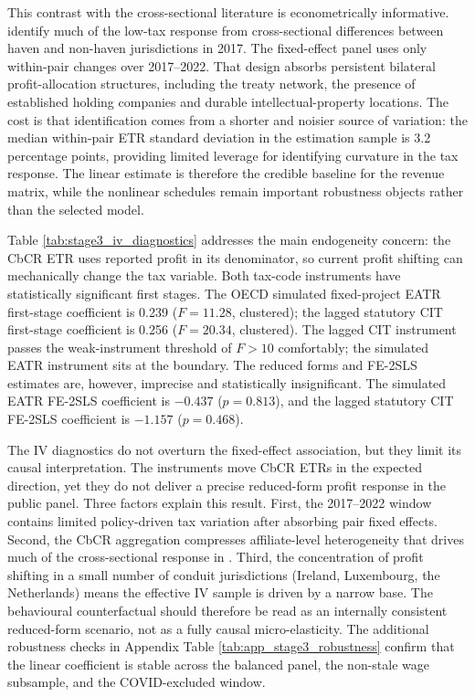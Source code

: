\documentclass[11pt,a4paper]{article}
\begin{document}
This contrast with the cross-sectional literature is econometrically informative. \citet{garcia-bernardo2024} identify much of the low-tax response from cross-sectional differences between haven and non-haven jurisdictions in 2017. The fixed-effect panel uses only within-pair changes over 2017--2022. That design absorbs persistent bilateral profit-allocation structures, including the treaty network, the presence of established holding companies and durable intellectual-property locations. The cost is that identification comes from a shorter and noisier source of variation: the median within-pair ETR standard deviation in the estimation sample is 3.2 percentage points, providing limited leverage for identifying curvature in the tax response. The linear estimate is therefore the credible baseline for the revenue matrix, while the nonlinear schedules remain important robustness objects rather than the selected model.




Table \ref{tab:stage3_iv_diagnostics} addresses the main endogeneity concern: the CbCR ETR uses reported profit in its denominator, so current profit shifting can mechanically change the tax variable. Both tax-code instruments have statistically significant first stages. The OECD simulated fixed-project EATR first-stage coefficient is 0.239 ($F = 11.28$, clustered); the lagged statutory CIT first-stage coefficient is 0.256 ($F = 20.34$, clustered). The lagged CIT instrument passes the \citet{stock2005} weak-instrument threshold of $F > 10$ comfortably; the simulated EATR instrument sits at the boundary. The reduced forms and FE-2SLS estimates are, however, imprecise and statistically insignificant. The simulated EATR FE-2SLS coefficient is $-0.437$ ($p=0.813$), and the lagged statutory CIT FE-2SLS coefficient is $-1.157$ ($p=0.468$).

The IV diagnostics do not overturn the fixed-effect association, but they limit its causal interpretation. The instruments move CbCR ETRs in the expected direction, yet they do not deliver a precise reduced-form profit response in the public panel. Three factors explain this result. First, the 2017--2022 window contains limited policy-driven tax variation after absorbing pair fixed effects. Second, the CbCR aggregation compresses affiliate-level heterogeneity that drives much of the cross-sectional response in \citet{garcia-bernardo2024}. Third, the concentration of profit shifting in a small number of conduit jurisdictions (Ireland, Luxembourg, the Netherlands) means the effective IV sample is driven by a narrow base. The behavioural counterfactual should therefore be read as an internally consistent reduced-form scenario, not as a fully causal micro-elasticity. The additional robustness checks in Appendix Table \ref{tab:app_stage3_robustness} confirm that the linear coefficient is stable across the balanced panel, the non-stale wage subsample, and the COVID-excluded window.
\end{document}
